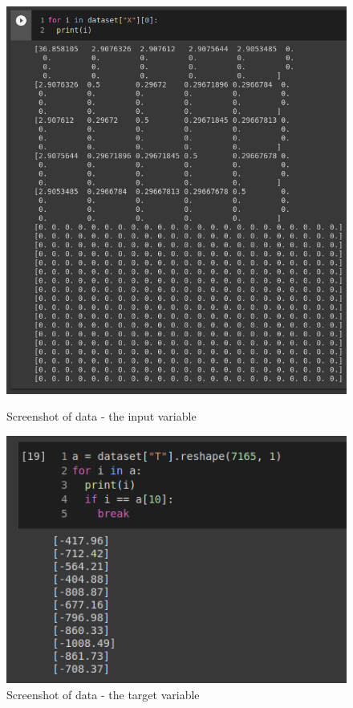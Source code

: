 \documentclass[a4paper,oneside,openright,11pt]{book}
\begin{document}
\begin{figure}[h!]
\centering
\includegraphics[scale=0.5]{DocumentFigures/MyFigures/input_data_CM.png}
\caption{Screenshot of data - the input variable}
\centering
\includegraphics[scale=0.8]{DocumentFigures/MyFigures/target_variable.png}
\caption{Screenshot of data - the target variable}
\end{figure}
\end{document}
